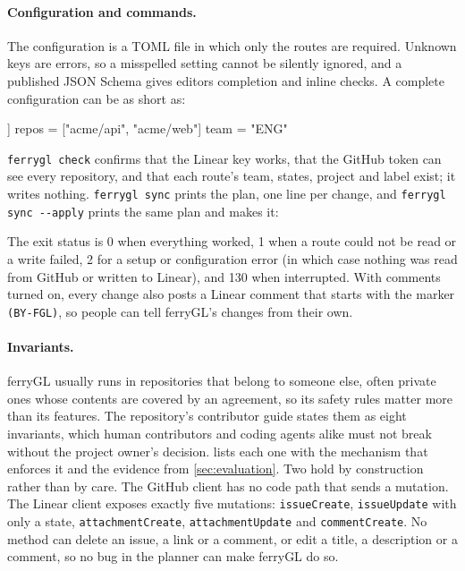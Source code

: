 \documentclass[11pt,a4paper]{article}
\newcommand{\ferry}{ferryGL}
\newcommand{\code}[1]{\texttt{#1}}
\newcommand{\opt}[1]{\texttt{-{}-#1}}
\begin{document}
\paragraph{Configuration and commands.} The configuration is a TOML file
\cite{prestonwerner2021toml} in which only the routes are required. Unknown keys are errors, so a
misspelled setting cannot be silently ignored, and a published JSON Schema
\cite{wright2018jsonschema} gives editors completion and inline checks. A complete configuration
can be as short as:
\begin{snippet}
[[route]]
repos = ["acme/api", "acme/web"]
team = "ENG"
\end{snippet}
\code{ferrygl check} confirms that the Linear key works, that the GitHub token can see every
repository, and that each route's team, states, project and label exist; it writes nothing.
\code{ferrygl sync} prints the plan, one line per change, and \code{ferrygl sync \opt{apply}}
prints the same plan and makes it:
The exit status is 0 when everything worked, 1 when a route could not be read or a write failed,
2 for a setup or configuration error (in which case nothing was read from GitHub or written to
Linear), and 130 when interrupted. With comments turned on, every change also posts a Linear
comment that starts with the marker \code{(BY-FGL)}, so people can tell \ferry's changes from
their own.

\paragraph{Invariants.} \ferry{} usually runs in repositories that belong to someone else,
often private ones whose contents are covered by an agreement, so its safety rules matter more
than its features. The repository's contributor guide states them as eight invariants, which
human contributors and coding agents alike must not break without the project owner's decision.
 lists each one with the mechanism that enforces it and the evidence from
\cref{sec:evaluation}. Two hold by construction rather than by care. The GitHub client has no
code path that sends a mutation. The Linear client exposes exactly five mutations:
\code{issueCreate}, \code{issueUpdate} with only a state, \code{attachmentCreate},
\code{attachmentUpdate} and \code{commentCreate}. No method can delete an issue, a link or a
comment, or edit a title, a description or a comment, so no bug in the planner can make \ferry{}
do so.
\end{document}

